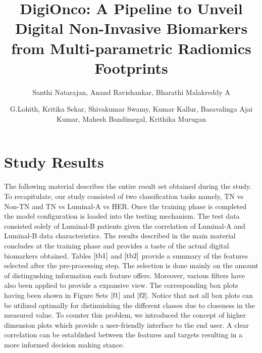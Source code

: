 \documentclass[10pt,final,1p,times,twocolumn]{elsarticle}
\begin{document}
\begin{frontmatter}
\title{DigiOnco: A Pipeline to Unveil Digital Non-Invasive Biomarkers from Multi-parametric Radiomics Footprints}


\author[label1]{Santhi Natarajan, Anand Ravishankar, Bharathi Malakreddy A}
\author[label2]{G.Lohith, Kritika Sekar, Shivakumar Swamy, Kumar Kallur, Basavalinga Ajai Kumar, Mahesh Bandimegal, Krithika Murugan}
\address[label1]{BMS Institute of Technology and Management, Visweswaraiah Technological Univesity, Bangalore, India}
\address[label2]{Health Care Global Hospitals, Bangalore, India}
\end{frontmatter}
\section{Study Results}

The following material describes the entire result set obtained during the study. To recapitulate, our study consisted of two classification tasks namely, TN vs Non-TN and TN vs Luminal-A vs HER. Once the training phase is completed the model configuration is loaded into the testing mechanism. The test data consisted solely of Luminal-B patients given the correlation of Luminal-A and Luminal-B data characteristics. The results described in the main material concludes at the training phase and provides a taste of the actual digital biomarkers obtained. Tables $\ref{tb1}$ and $\ref{tb2}$ provide a summary of the features selected after the pre-processing step. The selection is done mainly on the amount of distingushing information each feature offers. Moreover, various filters have also been applied to provide a expansive view.  The corresponding box plots having been shown in Figure Sets $\ref{f1}$ and $\ref{f2}$. Notice that not all box plots can be utilized optimally for distinuishing the different classes due to closeness in the measured value. To counter this problem, we introduced the concept of higher dimension plots which provide a user-friendly interface to the end user. A clear correlation can be established between the features and targets resulting in a more informed decision making stance.  
\end{document}
